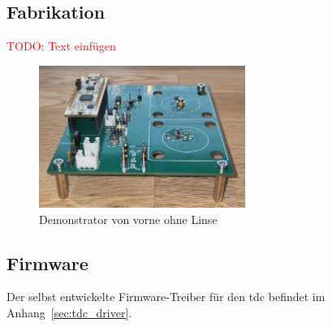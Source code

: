 \subsection{Fabrikation}

\textcolor{red}{TODO: Text einfügen}

\begin{figure}[H]
    \centering
    \includegraphics[width=0.6\textwidth]{graphics/photo_demonstrator_front_wo_lens.jpg}
    \caption{Demonstrator von vorne ohne Linse}\label{fig:photo_demonstrator_front_wo_lens}
\end{figure}

\subsection{Firmware}

Der selbst entwickelte Firmware-Treiber für den \acrshort{tdc} befindet im Anhang~\ref{sec:tdc_driver}.

\pagebreak